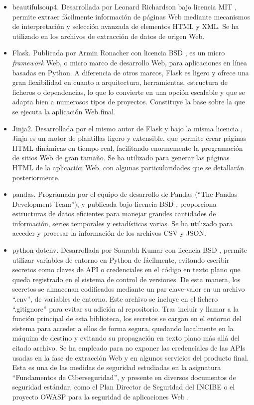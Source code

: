 \begin{itemize}
    \item beautifulsoup4. Desarrollada por Leonard Richardson bajo licencia MIT \cite{beautifulsoup4}, permite extraer fácilmente información de páginas Web mediante mecanismos de interpretación y selección avanzada de elementos HTML y XML. Se ha utilizado en los archivos de extracción de datos de origen Web.
    \item Flask. Publicada por Armin Ronacher con licencia BSD \cite{flask}, es un micro \textit{framework} Web, o micro marco de desarrollo Web, para aplicaciones en línea basadas en Python. A diferencia de otros marcos, Flask es ligero y ofrece una gran flexibilidad en cuanto a arquitectura, herramientas, estructura de ficheros o dependencias, lo que lo convierte en una opción escalable y que se adapta bien a numerosos tipos de proyectos. Constituye la base sobre la que se ejecuta la aplicación Web final.
    \item Jinja2. Desarrollada por el mismo autor de Flask y bajo la misma licencia \cite{jinja2}, Jinja es un motor de plantillas ligero y extensible, que permite crear páginas HTML dinámicas en tiempo real, facilitando enormemente la programación de sitios Web de gran tamaño. Se ha utilizado para generar las páginas HTML de la aplicación Web, con algunas particularidades que se detallarán posteriormente.
    \item pandas. Programada por el equipo de desarrollo de Pandas (``The Pandas Development Team''), y publicada bajo licencia BSD \cite{pandas}, proporciona estructuras de datos eficientes para manejar grandes cantidades de información, series temporales y estadísticas varias. Se ha utilizado para acceder y procesar la información de los archivos CSV y JSON.
    \item python-dotenv. Desarrollada por Saurabh Kumar con licencia BSD \cite{py_dotenv}, permite utilizar variables de entorno en Python de fácilmente, evitando escribir secretos como claves de API o credenciales en el código en texto plano que queda registrado en el sistema de control de versiones. De esta manera, los secretos se almacenan codificados mediante un par clave-valor en un archivo ``.env'', de variables de entorno. Este archivo se incluye en el fichero ``.gitignore'' para evitar su adición al repositorio. Tras incluir y llamar a la función principal de esta biblioteca, los secretos se cargan en el entorno del sistema para acceder a ellos de forma segura, quedando localmente en la máquina de destino y evitando su propagación en texto plano más allá del citado archivo. Se ha empleado para no exponer las credenciales de las APIs usadas en la fase de extracción Web y en algunos servicios del producto final. Esta es una de las medidas de seguridad estudiadas en la asignatura ``Fundamentos de Ciberseguridad'', y presente en diversos documentos de seguridad estándar, como el Plan Director de Seguridad del INCIBE \cite{INCIBE} o el proyecto OWASP para la seguridad de aplicaciones Web \cite{OWASP}.

\end{itemize}
